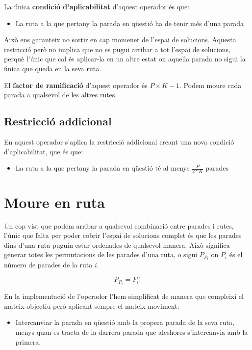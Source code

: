 La única \textbf{condició d'aplicabilitat} d'aquest operador és que:

\begin{itemize}
	\item La ruta a la que pertany la parada en qüestió ha de tenir més d'una parada
\end{itemize}

Això ens garanteix no sortir en cap momenet de l'espai de solucions. Aquesta restricció però no implica que no es pugui arribar a tot l'espai de solucions, perquè l'únic que cal és aplicar-la en un altre estat on aquella parada no sigui la única que queda en la seva ruta.

El \textbf{factor de ramificació} d'aquest operador és $P \times K-1$. Podem moure cada parada a qualsevol de les altres rutes.

\subsection{Restricció addicional} %
\label{sub:restadd}

En aquest operador s'aplica la restricció addicional creant una nova condició d'aplicabilitat, que és que:

\begin{itemize}
	\item La ruta a la que pertany la parada en qüestió té al menys $\frac{P}{2*K}$ parades
\end{itemize}



\section{Moure en ruta} %
\label{sec:moure_en_ruta}

Un cop vist que podem arribar a qualsevol combinació entre parades i rutes, l'únic que falta per poder cobrir l'espai de solucions complet és que les parades dins d'una ruta puguin estar ordenades de qualsevol manera. Això significa generar totes les permutacions de les parades d'una ruta, o sigui $P_{P_i}$ on $P_i$ és el número de parades de la ruta $i$.

\[
	P_{P_i} = P_i!
\]

En la implementació de l'operador l'hem simplificat de manera que compleixi el mateix objectiu però aplicant sempre el mateix moviment:
\begin{itemize}
	\item Intercanviar la parada en qüestió amb la propera parada de la seva ruta, menys quan es tracta de la darrera parada que aleshores s'intercanvia amb la primera.
\end{itemize}

